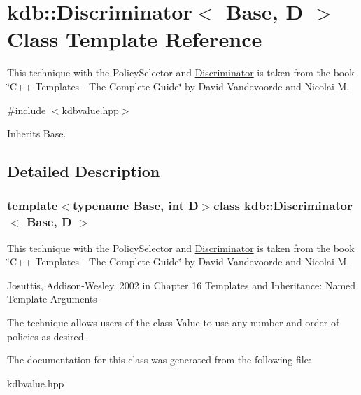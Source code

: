 \hypertarget{classkdb_1_1Discriminator}{\section{kdb\+:\+:Discriminator$<$ Base, D $>$ Class Template Reference}
\label{classkdb_1_1Discriminator}
}


This technique with the Policy\+Selector and \hyperlink{classkdb_1_1Discriminator}{Discriminator} is taken from the book \char`\"{}\+C++ Templates -\/ The Complete Guide\char`\"{} by David Vandevoorde and Nicolai M.  




{\ttfamily \#include $<$kdbvalue.\+hpp$>$}



Inherits Base.



\subsection{Detailed Description}
\subsubsection*{template$<$typename Base, int D$>$class kdb\+::\+Discriminator$<$ Base, D $>$}

This technique with the Policy\+Selector and \hyperlink{classkdb_1_1Discriminator}{Discriminator} is taken from the book \char`\"{}\+C++ Templates -\/ The Complete Guide\char`\"{} by David Vandevoorde and Nicolai M. 

Josuttis, Addison-\/\+Wesley, 2002 in Chapter 16 Templates and Inheritance\+: Named Template Arguments

The technique allows users of the class Value to use any number and order of policies as desired. 

The documentation for this class was generated from the following file\+:\begin{DoxyCompactItemize}
\item 
kdbvalue.\+hpp\end{DoxyCompactItemize}
